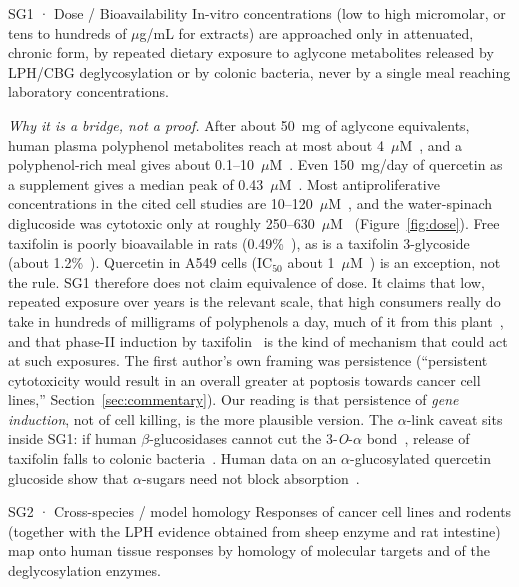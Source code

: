 \documentclass[11pt,a4paper]{article}
\begin{document}
\begin{sgbox}{SG1 · Dose / Bioavailability}
In-vitro concentrations (low to high micromolar, or tens to hundreds of $\mu$g/mL for extracts) are approached only in attenuated, chronic form, by repeated dietary exposure to aglycone metabolites released by LPH/CBG deglycosylation or by colonic bacteria, never by a single meal reaching laboratory concentrations.
\end{sgbox}

\noindent\emph{Why it is a bridge, not a proof.} After about 50~mg of aglycone equivalents, human plasma polyphenol metabolites reach at most about 4~$\mu$M~\cite{manach2005}, and a polyphenol-rich meal gives about 0.1--10~$\mu$M~\cite{kroon2004}. Even 150~mg/day of quercetin as a supplement gives a median peak of 0.43~$\mu$M~\cite{egert2008}. Most antiproliferative concentrations in the cited cell studies are 10--120~$\mu$M~\cite{hashemzaei2017,wang2020,hisaka2020}, and the water-spinach diglucoside was cytotoxic only at roughly 250--630~$\mu$M~\cite{prasad2005b} (Figure~\ref{fig:dose}). Free taxifolin is poorly bioavailable in rats (0.49\%~\cite{yang2016}), as is a taxifolin 3-glycoside (about 1.2\%~\cite{shi2020}). Quercetin in A549 cells (IC$_{50}$ about 1~$\mu$M~\cite{zheng2012}) is an exception, not the rule. SG1 therefore does not claim equivalence of dose. It claims that low, repeated exposure over years is the relevant scale, that high consumers really do take in hundreds of milligrams of polyphenols a day, much of it from this plant~\cite{thu2004}, and that phase-II induction by taxifolin~\cite{lee2007} is the kind of mechanism that could act at such exposures. The first author's own framing was persistence (``persistent cytotoxicity would result in an overall greater at poptosis towards cancer cell lines,'' Section~\ref{sec:commentary}). Our reading is that persistence of \emph{gene induction}, not of cell killing, is the more plausible version. The $\alpha$-link caveat sits inside SG1: if human $\beta$-glucosidases cannot cut the 3-\emph{O}-$\alpha$ bond~\cite{day1998,prasad2005}, release of taxifolin falls to colonic bacteria~\cite{braune2001}. Human data on an $\alpha$-glucosylated quercetin glucoside show that $\alpha$-sugars need not block absorption~\cite{murota2010}.

\begin{sgbox}{SG2 · Cross-species / model homology}
Responses of cancer cell lines and rodents (together with the LPH evidence obtained from sheep enzyme and rat intestine) map onto human tissue responses by homology of molecular targets and of the deglycosylation enzymes.
\end{sgbox}
\end{document}
